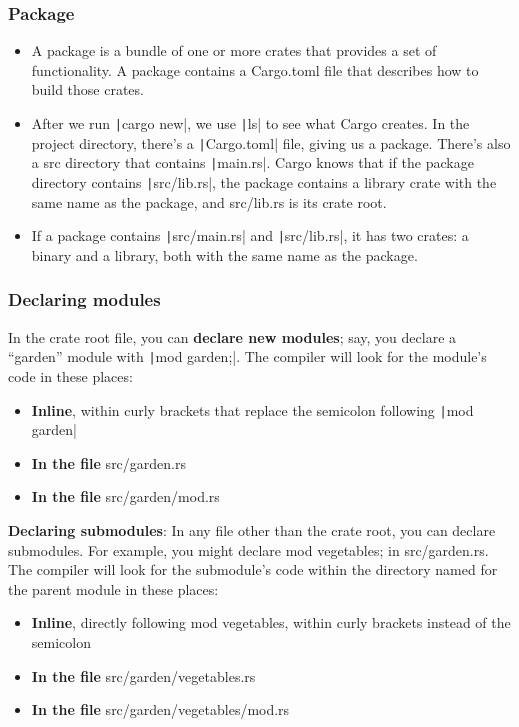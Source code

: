 \documentclass{beamer}
\begin{document}
\begin{frame}[fragile]
	\frametitle{Package}
	\begin{itemize}
		\item A package is a bundle of one or more crates that provides a set of functionality. A package contains a Cargo.toml file that describes how to build those crates.
		\item 	After we run \texttt|cargo new|, we use \texttt|ls| to see what Cargo creates. In the project directory, there’s a \texttt|Cargo.toml| file, giving us a package. There’s also a src directory that contains \texttt|main.rs|. Cargo knows that if the package directory contains \texttt|src/lib.rs|, the package contains a library crate with the same name as the package, and src/lib.rs is its crate root.
		\item If a package contains \texttt|src/main.rs| and \texttt|src/lib.rs|, it has two crates: a binary and a library, both with the same name as the package. 
	\end{itemize}
\end{frame}

\begin{frame}[fragile]
	\frametitle{Declaring modules}
	In the crate root file, you can \textbf{declare new modules}; say, you declare a “garden” module with  \texttt|mod garden;|. The compiler will look for the module’s code in these places:
\begin{itemize}
	\item 	\textbf{Inline}, within curly brackets that replace the semicolon following \texttt|mod garden|
	\item 	\textbf{In the file} src/garden.rs
	\item 	\textbf{In the file} src/garden/mod.rs
\end{itemize}
	
	\textbf{Declaring submodules}: In any file other than the crate root, you can declare submodules. For example, you might declare mod vegetables; in src/garden.rs. The compiler will look for the submodule’s code within the directory named for the parent module in these places:
\begin{itemize}
	\item 	\textbf{Inline}, directly following mod vegetables, within curly brackets instead of the semicolon
	\item 	\textbf{In the file} src/garden/vegetables.rs
	\item 	\textbf{In the file} src/garden/vegetables/mod.rs
\end{itemize}
	
\end{frame}
\end{document}
